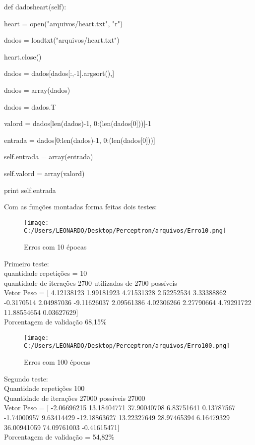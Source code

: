 \documentclass[
12pt, 
a4paper,
oneside,			%
english,			%
french,				%
spanish,			%
brazil,	
]{abntex2}
\begin{document}
def dadosheart(self):    
\setlength{\parindent}{1,5 cm}

heart = open("arquivos/heart.txt", "r")

dados = loadtxt("arquivos/heart.txt") 

heart.close()

dados = dados[dados[:,-1].argsort(),] 

dados = array(dados)

dados = dados.T

valord = dados[len(dados)-1, 0:(len(dados[0]))]-1

entrada = dados[0:len(dados)-1, 0:(len(dados[0]))]

self.entrada = array(entrada)

self.valord = array(valord)

print self.entrada
  
Com as funções montadas forma feitas dois testes:

\begin{figure}
	\centering
	\texttt{[image: C:/Users/LEONARDO/Desktop/Perceptron/arquivos/Erro10.png]}
	\caption{Erros com 10 épocas}
\end{figure}

Primeiro teste:\\
quantidade repetições = 10\\
quantidade de iterações 2700 utilizadas de 2700 possíveis\\
Vetor Peso = [  4.12138123   1.99181923   4.71531328   2.52252534   3.33388862 -0.3170514    2.04987036  -9.11626037   2.09561386   4.02306266 2.27790664   4.79291722  11.88554654   0.03627629]\\
Porcentagem de validação 68,15\%\\

\begin{figure}
	\centering
	\texttt{[image: C:/Users/LEONARDO/Desktop/Perceptron/arquivos/Erro100.png]}
	\caption{Erros com 100 épocas}
\end{figure}

Segundo teste:\\
Quantidade repetições 100\\
Quantidade de iterações 27000 possíveis 27000\\
Vetor Peso = [ -2.06696215  13.18404771  37.90040708   6.83751641   0.13787567 -1.74000957   9.63414429 -12.18863627  13.22327649  28.97465394 6.16479329  36.00941059  74.09761003  -0.41615471]\\
Porcentagem de validação = 54,82\%\\
\end{document}
